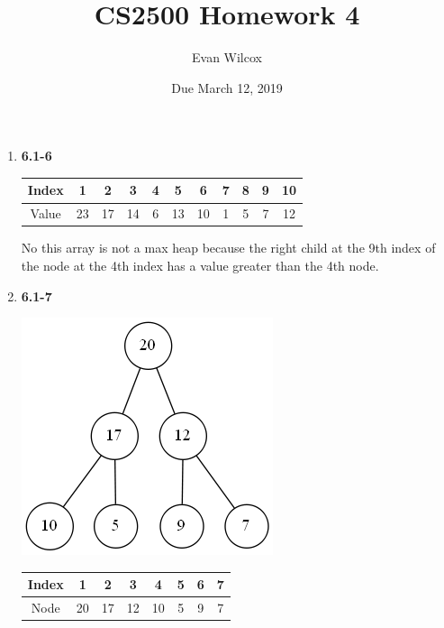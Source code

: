 \documentclass[a4paper]{article}
\title{CS2500 Homework 4}
\author{Evan Wilcox}
\date{Due March 12, 2019}
\begin{document}
    \maketitle

    \begin{enumerate}

        \item
        \textbf{6.1-6} \\

        \begin{tabular}{ c|c c c c c c c c c c }
            Index & 1 & 2 & 3 & 4 & 5 & 6 & 7 & 8 & 9 & 10 \\ \hline
            Value & 23 & 17 & 14 & 6 & 13 & 10 & 1 & 5 & 7 & 12 \\
        \end{tabular}

        No this array is not a max heap because the right child at the 9th index of 
        the node at the 4th index has a value greater than the 4th node.

        \vspace{3cm}

        \item
        \textbf{6.1-7} \\

        \begin{center}
            \includegraphics[scale=0.4]{61-7}

            \begin{tabular}{ c|c c c c c c c }
                Index & 1  & 2  & 3  & 4  & 5 & 6 & 7 \\ \hline
                Node  & 20 & 17 & 12 & 10 & 5 & 9 & 7 \\
            \end{tabular}
        \end{center}


\end{enumerate}
\end{document}
